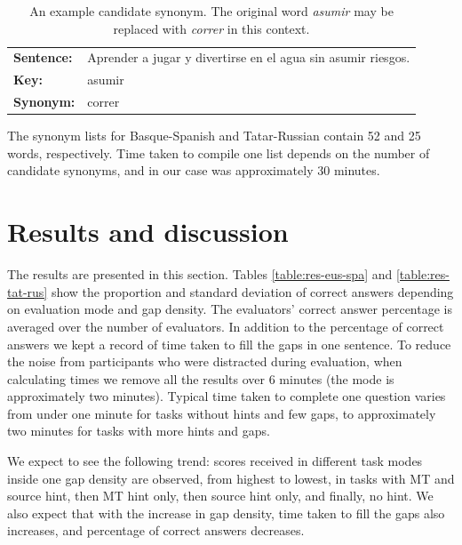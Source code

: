 \documentclass[11pt]{article}
\newcommand{\comment}[1]{\marginpar{\scriptsize\sf \textcolor{blue}{#1}}}
\begin{document}
\begin{table}
  \centering
  \begin{tabular}{|l|l|}
     \hline
     \textbf{Sentence:}   & Aprender a jugar y divertirse en el agua sin asumir riesgos. \\
     \textbf{Key:}   & asumir \\
     \textbf{Synonym:} & correr \\
     \hline
  \end{tabular}
  \caption{An example candidate synonym. The original word \emph{asumir} may be replaced with \emph{correr} in this context.} 
  \label{table:syn}
\end{table}
\comment{EA: added}
The synonym lists for Basque-Spanish and Tatar-Russian contain 52 and 25 words, respectively. Time taken to compile one list depends on the number of candidate synonyms, and in our case was approximately 30 minutes. 
\comment{FMT: How long did making the synonym list take, how many synonyms were added? More details here. Also perhaps an example?}

\section{Results and discussion}
\label{sec:results}

The results are presented in this section. Tables \ref{table:res-eus-spa} and \ref{table:res-tat-rus} show
the proportion and standard deviation of correct answers depending on evaluation mode and gap density.\comment{FMT: We should probably integrate the other tables, and refer to them using labels.} The evaluators' correct answer percentage is averaged over the number of evaluators. In addition to the percentage of correct answers we kept a record of time taken to fill the gaps in one sentence. To reduce the noise from participants who were distracted during evaluation, when
calculating times we remove all the results over 6 minutes (the mode is approximately
two minutes). Typical time taken to complete one question varies from under one minute for tasks without hints and few gaps, to approximately two minutes for tasks with more hints and gaps.

We expect to see the following trend: scores received in different task modes inside one gap density are observed, from highest to lowest, in tasks with MT and source hint, then MT hint only, then source hint only, and finally, no hint. We also expect that with the increase in gap density, time taken to fill the gaps also increases, and percentage of correct answers decreases. 
\end{document}
